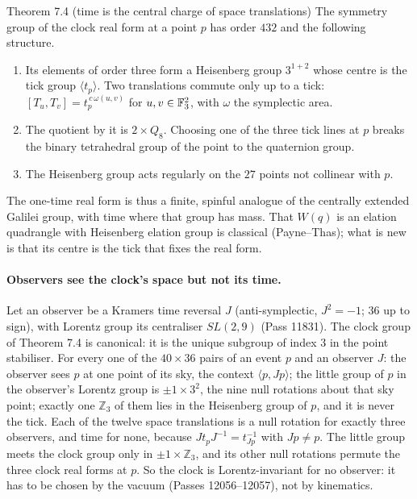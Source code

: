 \begin{result}{Theorem 7.4 (time is the central charge of space translations) \hfill \tierC}
The symmetry group of the clock real form at a point $p$ has order $432$ and the following structure.
\begin{enumerate}
\item Its elements of order three form a Heisenberg group $3^{1+2}$ whose centre is the tick group $\langle t_p\rangle$.
      Two translations commute only up to a tick:
      $[T_u,T_v]=t_p^{\,c\,\omega(u,v)}$ for $u,v\in\mathbb{F}_3^2$, with $\omega$ the symplectic area.
\item The quotient by it is $2\times Q_8$. Choosing one of the three tick lines at $p$ breaks the binary tetrahedral
      group of the point to the quaternion group.
\item The Heisenberg group acts regularly on the $27$ points not collinear with $p$.
\end{enumerate}
The one-time real form is thus a finite, spinful analogue of the centrally extended Galilei group, with time where
that group has mass. That $W(q)$ is an elation quadrangle with Heisenberg elation group is classical
(Payne--Thas); what is new is that its centre is the tick that fixes the real form. 
\end{result}

\paragraph{Observers see the clock's space but not its time.}
Let an observer be a Kramers time reversal $J$ (anti-symplectic, $J^2=-1$; $36$ up to sign), with Lorentz group
its centraliser $SL(2,9)$ (Pass 11831). The clock group of Theorem 7.4 is canonical: it is the unique subgroup of
index $3$ in the point stabiliser. For every one of the $40\times36$ pairs of an event $p$ and an observer $J$:
the observer sees $p$ at one point of its sky, the context $\langle p,Jp\rangle$; the little group of $p$ in
the observer's Lorentz group is $\pm1\times3^2$, the nine null rotations about that sky point; exactly one
$\mathbb Z_3$ of them lies in the Heisenberg group of $p$, and it is never the tick. Each of the twelve space
translations is a null rotation for exactly three observers, and time for none, because
$Jt_pJ^{-1}=t_{Jp}^{-1}$ with $Jp\ne p$. The little group meets the clock group only in $\pm1\times\mathbb Z_3$,
and its other null rotations permute the three clock real forms at $p$. So the clock is Lorentz-invariant for no
observer: it has to be chosen by the vacuum (Passes 12056--12057), not by kinematics. 

